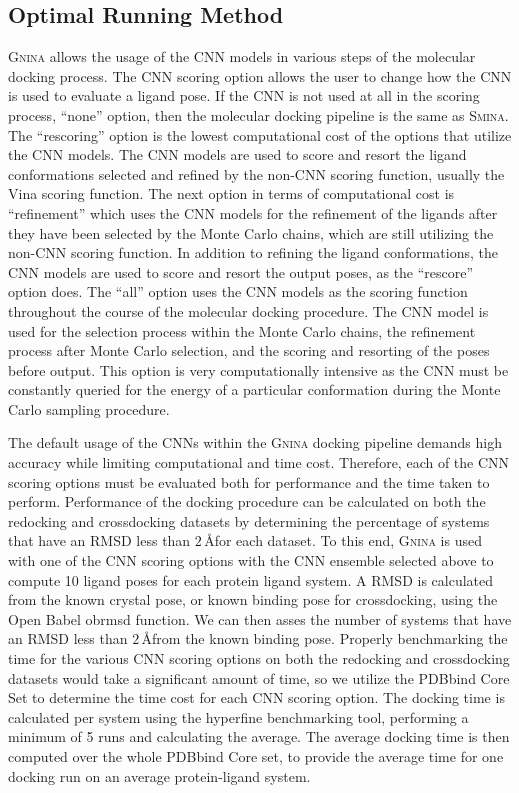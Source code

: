 \documentclass[journal=jcisd8,manuscript=article]{achemso}
\begin{document}
\subsection{Optimal Running Method}
\textsc{Gnina} allows the usage of the CNN models in various steps of the molecular docking process. The CNN scoring option allows the user to change how the CNN is used to evaluate a ligand pose. If the CNN is not used at all in the scoring process, ``none'' option, then the molecular docking pipeline is the same as \textsc{Smina}. The ``rescoring'' option is the lowest computational cost of the options that utilize the CNN models. The CNN models are used to score and resort the ligand conformations selected and refined by the non-CNN scoring function, usually the Vina scoring function. The next option in terms of computational cost is ``refinement'' which uses the CNN models for the refinement of the ligands after they have been selected by the Monte Carlo chains, which are still utilizing the non-CNN scoring function. In addition to refining the ligand conformations, the CNN models are used to score and resort the output poses, as the ``rescore'' option does. The ``all'' option uses the CNN models as the scoring function throughout the course of the molecular docking procedure. The CNN model is used for the selection process within the Monte Carlo chains, the refinement process after Monte Carlo selection, and the scoring and resorting of the poses before output. This option is very computationally intensive as the CNN must be constantly queried for the energy of a particular conformation during the Monte Carlo sampling procedure.

The default usage of the CNNs within the \textsc{Gnina} docking pipeline demands high accuracy while limiting computational and time cost. Therefore, each of the CNN scoring options must be evaluated both for performance and the time taken to perform. Performance of the docking procedure can be calculated on both the redocking and crossdocking datasets by determining the percentage of systems that have an RMSD less than $2\,$\AA for each dataset. To this end, \textsc{Gnina} is used with one of the CNN scoring options with the CNN ensemble selected above to compute 10 ligand poses for each protein ligand system. A RMSD is calculated from the known crystal pose, or known binding pose for crossdocking, using the Open Babel obrmsd function. We can then asses the number of systems that have an RMSD less than $2\,$\AA from the known binding pose. Properly benchmarking the time for the various CNN scoring options on both the redocking and crossdocking datasets would take a significant amount of time, so we utilize the PDBbind Core Set to determine the time cost for each CNN scoring option. The docking time is calculated per system using the hyperfine benchmarking tool\cite{hyperfine}, performing a minimum of 5 runs and calculating the average. The average docking time is then computed over the whole PDBbind Core set, to provide the average time for one docking run on an average protein-ligand system.
\end{document}
